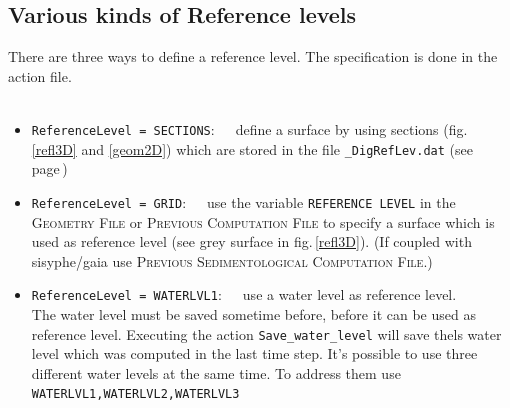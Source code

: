 \newpage
\subsection{Various kinds of Reference levels}\label{ssec:E4RefLev}
\label{txt:Reflevel}
%
There are three ways to define a reference level.
The specification is done in the action file.\\
\\

\begin{itemize}
  \itemsep20pt
  \item \texttt{ReferenceLevel = SECTIONS}:~~~define a surface by using sections
        (fig.\,\ref{refl3D} and \ref{geom2D}) which are stored in the file \texttt{\_DigRefLev.dat}
        (see page\,\pageref{txt:sectionFile})\\
  \item \texttt{ReferenceLevel = GRID}:~~~use the variable \texttt{REFERENCE LEVEL} in the \textsc{Geometry File}
        or \textsc{Previous Computation File} to specify a surface
        which is used as reference level (see grey surface in fig.\,\ref{refl3D}).
        (If coupled with sisyphe/gaia use \textsc{Previous Sedimentological Computation File}.)
  \item \texttt{ReferenceLevel = WATERLVL1}:~~~use a water level as reference level.
        \\The water level must be saved sometime before, before it can be used as reference level.
        Executing the action \texttt{Save\_water\_level} will save thels water level
        which was computed in the last time step. It's possible to use three different
        water levels at the same time. To address them use \texttt{WATERLVL1,WATERLVL2,WATERLVL3}
\end{itemize}

